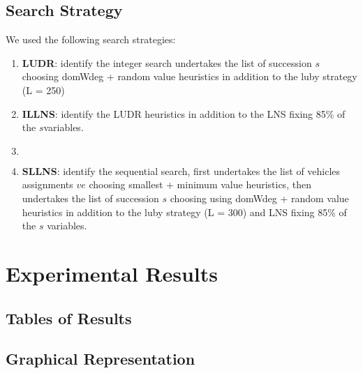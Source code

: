 \subsection{Search Strategy}
We used the following search strategies:
\begin{enumerate}
    \item \textbf{LUDR}: identify the integer search undertakes the list of succession \begin{math}s\end{math} choosing domWdeg + random value heuristics in addition to the luby strategy (L = 250)
    \item \textbf{ILLNS}: identify the LUDR heuristics in addition to the LNS fixing 85\% of the \begin{math}s\end{math}variables.
    \item \begin{math}\end{math}
    \item \textbf{SLLNS}: identify the sequential search, first undertakes the list of vehicles assignments \begin{math} ve \end{math} choosing smallest + minimum value heuristics, then undertakes the list of succession \begin{math} s\end{math} choosing using domWdeg + random value heuristics in addition to the luby strategy (L = 300) and LNS fixing 85\% of the \begin{math} s\end{math} variables.
    
    
\end{enumerate}
\section{Experimental Results}
\subsection{Tables of Results}
\subsection{Graphical Representation}